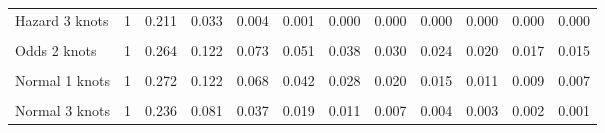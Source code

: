 \documentclass[
]{article}
\begin{document}
\begin{table}[H]
{\begin{tabular}[t]{lrrrrrrrrrrr}
Hazard 3 knots & 1 & 0.211 & 0.033 & 0.004 & 0.001 & 0.000 & 0.000 & 0.000 & 0.000 & 0.000 & 0.000\\
\cellcolor{gray!10}{Odds 1 knots} & \cellcolor{gray!10}{1} & \cellcolor{gray!10}{0.285} & \cellcolor{gray!10}{0.145} & \cellcolor{gray!10}{0.093} & \cellcolor{gray!10}{0.067} & \cellcolor{gray!10}{0.052} & \cellcolor{gray!10}{0.042} & \cellcolor{gray!10}{0.035} & \cellcolor{gray!10}{0.030} & \cellcolor{gray!10}{0.026} & \cellcolor{gray!10}{0.023}\\
Odds 2 knots & 1 & 0.264 & 0.122 & 0.073 & 0.051 & 0.038 & 0.030 & 0.024 & 0.020 & 0.017 & 0.015\\
\cellcolor{gray!10}{Odds 3 knots} & \cellcolor{gray!10}{1} & \cellcolor{gray!10}{0.238} & \cellcolor{gray!10}{0.094} & \cellcolor{gray!10}{0.051} & \cellcolor{gray!10}{0.033} & \cellcolor{gray!10}{0.023} & \cellcolor{gray!10}{0.018} & \cellcolor{gray!10}{0.014} & \cellcolor{gray!10}{0.011} & \cellcolor{gray!10}{0.009} & \cellcolor{gray!10}{0.008}\\
Normal 1 knots & 1 & 0.272 & 0.122 & 0.068 & 0.042 & 0.028 & 0.020 & 0.015 & 0.011 & 0.009 & 0.007\\
\cellcolor{gray!10}{Normal 2 knots} & \cellcolor{gray!10}{1} & \cellcolor{gray!10}{0.270} & \cellcolor{gray!10}{0.119} & \cellcolor{gray!10}{0.065} & \cellcolor{gray!10}{0.040} & \cellcolor{gray!10}{0.027} & \cellcolor{gray!10}{0.019} & \cellcolor{gray!10}{0.014} & \cellcolor{gray!10}{0.010} & \cellcolor{gray!10}{0.008} & \cellcolor{gray!10}{0.006}\\
Normal 3 knots & 1 & 0.236 & 0.081 & 0.037 & 0.019 & 0.011 & 0.007 & 0.004 & 0.003 & 0.002 & 0.001\\
\bottomrule
\end{tabular}}
\end{table}
\end{document}
